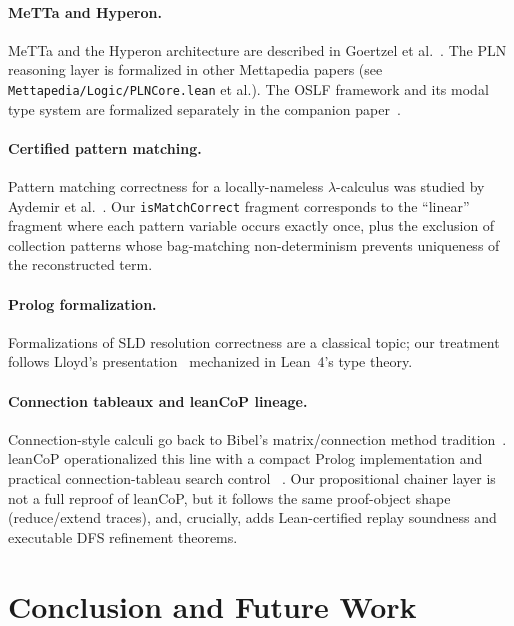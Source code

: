 \documentclass[]{article}
\newcommand{\code}[1]{\texttt{#1}}
\newcommand{\MeTTa}{\textup{MeTTa}}
\newcommand{\OSLF}{\textup{OSLF}}
\begin{document}
\paragraph{\MeTTa{} and Hyperon.}
MeTTa and the Hyperon architecture are described in Goertzel et al.~\cite{goertzel2009pln}.
The PLN reasoning layer is formalized in other Mettapedia papers
(see \code{Mettapedia/Logic/PLNCore.lean} et al.).
The \OSLF{} framework and its modal type system are formalized separately
in the companion paper~\cite{leanOSLF2025}.

\paragraph{Certified pattern matching.}
Pattern matching correctness for a locally-nameless $\lambda$-calculus was studied
by Aydemir et al.~\cite{AydemarPOPL2008}.  Our \code{isMatchCorrect} fragment
corresponds to the ``linear'' fragment where each pattern variable occurs exactly
once, plus the exclusion of collection patterns whose bag-matching non-determinism
prevents uniqueness of the reconstructed term.

\paragraph{Prolog formalization.}
Formalizations of SLD resolution correctness are a classical topic; our treatment
follows Lloyd's presentation~\cite{Lloyd1987} mechanized in Lean~4's type theory.

\paragraph{Connection tableaux and leanCoP lineage.}
Connection-style calculi go back to Bibel's matrix/connection method
tradition~\cite{Bibel1987}.  leanCoP operationalized this line with a compact
Prolog implementation and practical connection-tableau search control
~\cite{Otten2010leanCoP}.  Our propositional chainer layer is not a full reproof
of leanCoP, but it follows the same proof-object shape (reduce/extend traces),
and, crucially, adds Lean-certified replay soundness and executable DFS
refinement theorems.

\section{Conclusion and Future Work}
\label{sec:conclusion}
\end{document}
